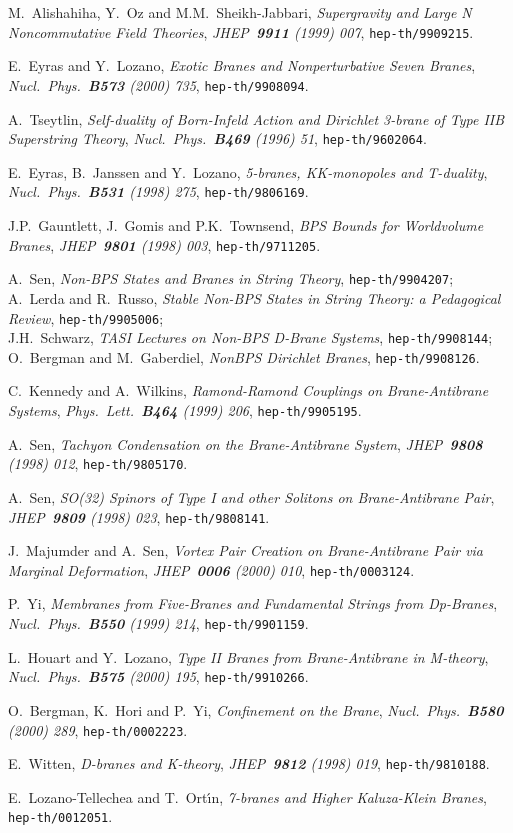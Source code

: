 \documentclass[12pt,a4paper]{article}
\begin{document}
\begin{thebibliography}{99}
M.~Alishahiha, Y.~Oz and M.M.~Sheikh-Jabbari, {\sl Supergravity and
Large N Noncommutative Field Theories}, {\it JHEP~{\bf 9911} (1999) 007},
{\tt hep-th/9909215}.

E.~Eyras and Y.~Lozano,
{\sl Exotic Branes and Nonperturbative Seven Branes},
{\it Nucl.~Phys.~{\bf B573} (2000) 735},
{\tt hep-th/9908094}.

A.~Tseytlin, {\sl Self-duality of Born-Infeld Action and
Dirichlet 3-brane of Type IIB Superstring Theory},
{\it Nucl.~Phys.~{\bf B469} (1996) 51},
{\tt hep-th/9602064}.

E.~Eyras, B.~Janssen and Y.~Lozano,
{\sl 5-branes, KK-monopoles and T-duality},
{\it Nucl.~Phys.~{\bf B531} (1998) 275},
{\tt hep-th/9806169}.

J.P.~Gauntlett, J.~Gomis and P.K.~Townsend, {\sl BPS Bounds for
Worldvolume Branes}, 
{\sl JHEP~{\bf 9801} (1998) 003}, {\tt hep-th/9711205}.

A.~Sen, {\sl Non-BPS States and Branes in String Theory},
{\tt hep-th/9904207}; \\
A.~Lerda and R.~Russo, {\sl Stable Non-BPS States in String Theory: a
Pedagogical Review}, {\tt hep-th/9905006}; \\
J.H.~Schwarz, {\sl TASI Lectures on Non-BPS D-Brane Systems},
{\tt hep-th/9908144}; \\
O.~Bergman and M.~Gaberdiel, {\sl NonBPS Dirichlet Branes},
{\tt hep-th/9908126}.

C.~Kennedy and A.~Wilkins, {\sl Ramond-Ramond Couplings on 
Brane-Antibrane Systems}, {\it Phys.~Lett.~{\bf B464} (1999) 206},
{\tt hep-th/9905195}.

A.~Sen, {\sl Tachyon Condensation on the Brane-Antibrane System},
{\it JHEP~{\bf 9808} (1998) 012}, {\tt hep-th/9805170}.

A.~Sen, {\sl SO(32) Spinors of Type I and other Solitons on
Brane-Antibrane Pair}, {\it JHEP~{\bf 9809} (1998) 023},
{\tt hep-th/9808141}.

J.~Majumder and A.~Sen, {\sl Vortex Pair Creation on Brane-Antibrane
Pair via Marginal Deformation}, {\it JHEP~{\bf 0006} (2000) 010},
{\tt hep-th/0003124}.

P.~Yi, {\sl Membranes from Five-Branes and Fundamental Strings
from Dp-Branes}, {\it Nucl.~Phys.~{\bf B550} (1999) 214},
{\tt hep-th/9901159}.

L.~Houart and Y.~Lozano, {\sl Type II Branes from Brane-Antibrane
in M-theory}, {\it Nucl.~Phys.~{\bf B575} (2000) 195},
{\tt hep-th/9910266}.

O.~Bergman, K.~Hori and P.~Yi, {\sl Confinement on the Brane},
{\it Nucl.~Phys.~{\bf B580} (2000) 289},
{\tt hep-th/0002223}.

E.~Witten, {\sl D-branes and K-theory},
{\it JHEP~{\bf 9812} (1998) 019},
{\tt hep-th/9810188}.

E.~Lozano-Tellechea and T.~Ort\'{\i}n, {\sl 7-branes and Higher
Kaluza-Klein Branes}, {\tt hep-th/0012051}.


\end{thebibliography}
\end{document}
